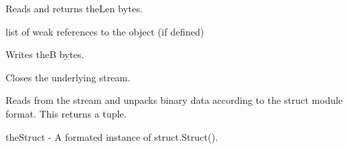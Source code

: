 \documentclass[letterpaper,10pt,english]{sphinxmanual}
\begin{document}
\begin{fulllineitems}
\begin{fulllineitems}
\label{\detokenize{ref/LIS/core/RawStream:TotalDepth.LIS.core.RawStream.RawStream.read}}
Reads and returns theLen bytes.

\end{fulllineitems}


\begin{fulllineitems}
\label{\detokenize{ref/LIS/core/RawStream:TotalDepth.LIS.core.RawStream.RawStream.__weakref__}}
list of weak references to the object (if defined)

\end{fulllineitems}


\begin{fulllineitems}
\label{\detokenize{ref/LIS/core/RawStream:TotalDepth.LIS.core.RawStream.RawStream.write}}
Writes theB bytes.

\end{fulllineitems}


\begin{fulllineitems}
\label{\detokenize{ref/LIS/core/RawStream:TotalDepth.LIS.core.RawStream.RawStream.close}}
Closes the underlying stream.

\end{fulllineitems}


\begin{fulllineitems}
\label{\detokenize{ref/LIS/core/RawStream:TotalDepth.LIS.core.RawStream.RawStream.readAndUnpack}}
Reads from the stream and unpacks binary data according to the
struct module format. This returns a tuple.

theStruct - A formated instance of struct.Struct().

\end{fulllineitems}


\end{fulllineitems}
\end{document}
